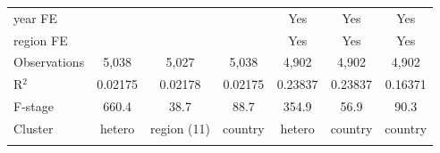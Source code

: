 \begin{tabular}{lcccccc}
   \midrule 
   year FE           &                     &                   &                     & Yes                 & Yes                 & Yes\\  
   region FE         &                     &                   &                     & Yes                 & Yes                 & Yes\\  
   \midrule 
   Observations      & 5,038               & 5,027             & 5,038               & 4,902               & 4,902               & 4,902\\  
   R$^2$             & 0.02175             & 0.02178           & 0.02175             & 0.23837             & 0.23837             & 0.16371\\  
   F-stage           & 660.4               & 38.7              & 88.7                & 354.9               & 56.9                & 90.3\\  
   Cluster           & hetero              & region (11)       & country             & hetero              & country             & country\\  
   \bottomrule
   \multicolumn{7}{l}{\emph{  }}\\
\end{tabular}
\par\endgroup


